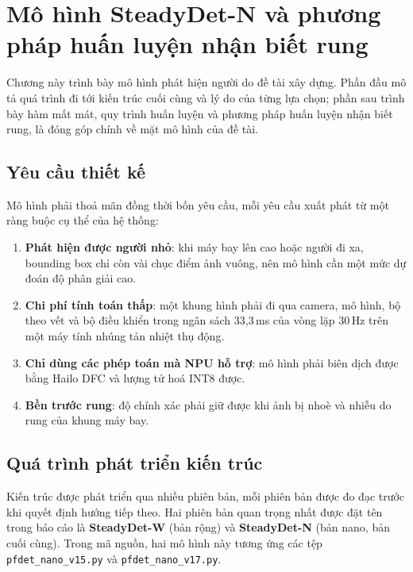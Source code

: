 \chapter{Mô hình SteadyDet-N và phương pháp huấn luyện nhận biết rung}
\label{chap:mohinh}

Chương này trình bày mô hình phát hiện người do đề tài xây dựng. Phần đầu mô tả quá trình đi tới kiến trúc cuối cùng và lý do của từng lựa chọn; phần sau trình bày hàm mất mát, quy trình huấn luyện và phương pháp huấn luyện nhận biết rung, là đóng góp chính về mặt mô hình của đề tài.

\section{Yêu cầu thiết kế}

Mô hình phải thoả mãn đồng thời bốn yêu cầu, mỗi yêu cầu xuất phát từ một ràng buộc cụ thể của hệ thống:
\begin{enumerate}
\item \textbf{Phát hiện được người nhỏ}: khi máy bay lên cao hoặc người đi xa, bounding box chỉ còn vài chục điểm ảnh vuông, nên mô hình cần một mức dự đoán độ phân giải cao.
\item \textbf{Chi phí tính toán thấp}: một khung hình phải đi qua camera, mô hình, bộ theo vết và bộ điều khiển trong ngân sách 33,3\,ms của vòng lặp 30\,Hz trên một máy tính nhúng tản nhiệt thụ động.
\item \textbf{Chỉ dùng các phép toán mà NPU hỗ trợ}: mô hình phải biên dịch được bằng Hailo DFC và lượng tử hoá INT8 được.
\item \textbf{Bền trước rung}: độ chính xác phải giữ được khi ảnh bị nhoè và nhiễu do rung của khung máy bay.
\end{enumerate}

\section{Quá trình phát triển kiến trúc}

Kiến trúc được phát triển qua nhiều phiên bản, mỗi phiên bản được đo đạc trước khi quyết định hướng tiếp theo. Hai phiên bản quan trọng nhất được đặt tên trong báo cáo là \textbf{SteadyDet-W} (bản rộng) và \textbf{SteadyDet-N} (bản nano, bản cuối cùng). Trong mã nguồn, hai mô hình này tương ứng các tệp \texttt{pfdet\_nano\_v15.py} và \texttt{pfdet\_nano\_v17.py}.

